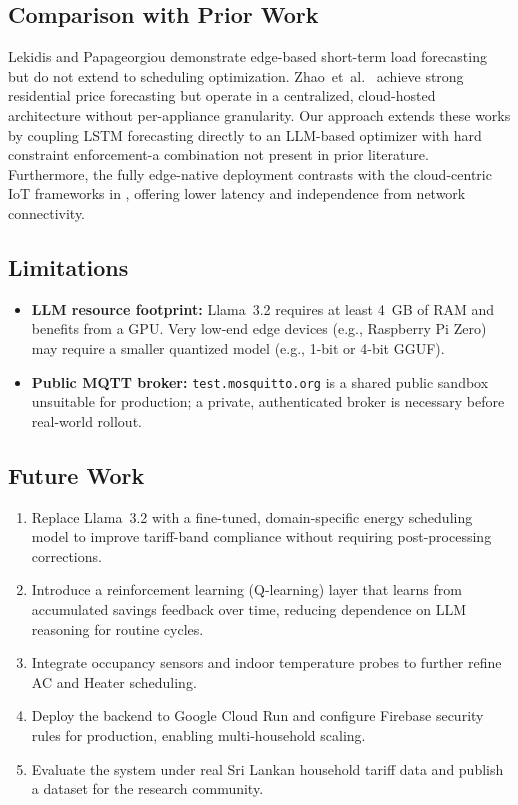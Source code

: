 \documentclass[conference]{IEEEtran}
\begin{document}
\subsection{Comparison with Prior Work}

Lekidis and Papageorgiou \cite{lekidis2023edge} demonstrate
edge-based short-term load forecasting but do not extend to
scheduling optimization.
Zhao~et~al.~\cite{zhao2024residential} achieve strong
residential price forecasting but operate in a centralized,
cloud-hosted architecture without per-appliance granularity.
Our approach extends these works by coupling LSTM forecasting
directly to an LLM-based optimizer with hard constraint
enforcement-a combination not present in prior literature.
Furthermore, the fully edge-native deployment contrasts with
the cloud-centric IoT frameworks in \cite{ali2023iot,zawish2023energy},
offering lower latency and independence from network connectivity.

\subsection{Limitations}

\begin{itemize}
  \item \textbf{LLM resource footprint:} Llama~3.2 requires
        at least 4~GB of RAM and benefits from a GPU. Very low-end
        edge devices (e.g., Raspberry Pi Zero) may require a
        smaller quantized model (e.g., 1-bit or 4-bit GGUF).
  \item \textbf{Public MQTT broker:} \texttt{test.mosquitto.org}
        is a shared public sandbox unsuitable for production;
        a private, authenticated broker is necessary before
        real-world rollout.
\end{itemize}

\subsection{Future Work}

\begin{enumerate}
  \item Replace Llama~3.2 with a fine-tuned, domain-specific
        energy scheduling model to improve tariff-band compliance
        without requiring post-processing corrections.
  \item Introduce a reinforcement learning (Q-learning) layer
        that learns from accumulated savings feedback over time,
        reducing dependence on LLM reasoning for routine cycles.
  \item Integrate occupancy sensors and indoor temperature
        probes to further refine AC and Heater scheduling.
  \item Deploy the backend to Google Cloud Run and configure
        Firebase security rules for production, enabling
        multi-household scaling.
  \item Evaluate the system under real Sri Lankan household
        tariff data and publish a dataset for the research community.
\end{enumerate}
\end{document}
